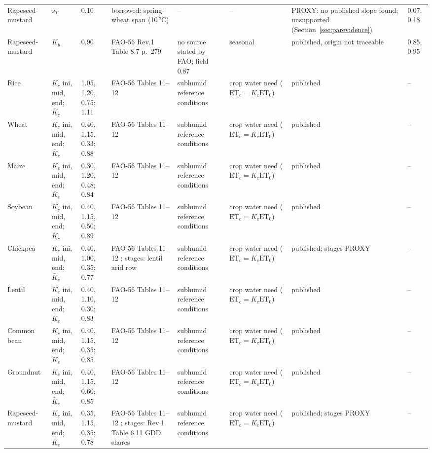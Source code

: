 {\begin{longtable}{L{0.091}L{0.098}L{0.098}L{0.171}L{0.183}L{0.140}L{0.122}L{0.098}}
Rapeseed-mustard & $s_T$ & 0.10 & borrowed: \citet{deryng2014} spring-wheat span (10\,\si{\celsius}) & -- & -- & PROXY: no published slope found; unsupported (Section~\ref{sec:parevidence}) & 0.07, 0.18 \\
Rapeseed-mustard & $K_y$ & 0.90 & FAO-56 Rev.1 Table 8.7 p.~279 \citep{fao56rev1} & no source stated by FAO; field 0.87 \citep{istanbulluoglu2010} & seasonal & published, origin not traceable & 0.85, 0.95 \\
Rice & $K_c$ ini, mid, end; $\bar K_c$ & 1.05, 1.20, 0.75; 1.11 & FAO-56 Tables 11--12 \citep{fao56} & subhumid reference conditions & crop water need ($\mathrm{ET_c}=K_c\mathrm{ET_0}$) & published & -- \\
Wheat & $K_c$ ini, mid, end; $\bar K_c$ & 0.40, 1.15, 0.33; 0.88 & FAO-56 Tables 11--12 \citep{fao56} & subhumid reference conditions & crop water need ($\mathrm{ET_c}=K_c\mathrm{ET_0}$) & published & -- \\
Maize & $K_c$ ini, mid, end; $\bar K_c$ & 0.30, 1.20, 0.48; 0.84 & FAO-56 Tables 11--12 \citep{fao56} & subhumid reference conditions & crop water need ($\mathrm{ET_c}=K_c\mathrm{ET_0}$) & published & -- \\
Soybean & $K_c$ ini, mid, end; $\bar K_c$ & 0.40, 1.15, 0.50; 0.89 & FAO-56 Tables 11--12 \citep{fao56} & subhumid reference conditions & crop water need ($\mathrm{ET_c}=K_c\mathrm{ET_0}$) & published & -- \\
Chickpea & $K_c$ ini, mid, end; $\bar K_c$ & 0.40, 1.00, 0.35; 0.77 & FAO-56 Tables 11--12 \citep{fao56}; stages: lentil arid row & subhumid reference conditions & crop water need ($\mathrm{ET_c}=K_c\mathrm{ET_0}$) & published; stages PROXY & -- \\
Lentil & $K_c$ ini, mid, end; $\bar K_c$ & 0.40, 1.10, 0.30; 0.83 & FAO-56 Tables 11--12 \citep{fao56} & subhumid reference conditions & crop water need ($\mathrm{ET_c}=K_c\mathrm{ET_0}$) & published & -- \\
Common bean & $K_c$ ini, mid, end; $\bar K_c$ & 0.40, 1.15, 0.35; 0.85 & FAO-56 Tables 11--12 \citep{fao56} & subhumid reference conditions & crop water need ($\mathrm{ET_c}=K_c\mathrm{ET_0}$) & published & -- \\
Groundnut & $K_c$ ini, mid, end; $\bar K_c$ & 0.40, 1.15, 0.60; 0.85 & FAO-56 Tables 11--12 \citep{fao56} & subhumid reference conditions & crop water need ($\mathrm{ET_c}=K_c\mathrm{ET_0}$) & published & -- \\
Rapeseed-mustard & $K_c$ ini, mid, end; $\bar K_c$ & 0.35, 1.15, 0.35; 0.78 & FAO-56 Tables 11--12 \citep{fao56}; stages: Rev.1 Table 6.11 GDD shares & subhumid reference conditions & crop water need ($\mathrm{ET_c}=K_c\mathrm{ET_0}$) & published; stages PROXY & -- \\

\end{longtable}}
